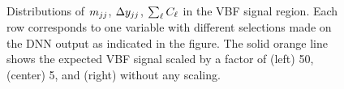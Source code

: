 \begin{figure}[ht]
{        } \\
         \\
        {\caption{Distributions of $m_{jj}$, $\Delta y_{jj}$, $\sum_\ell C_\ell$ in the VBF \TwoJet signal region.
            Each row corresponds to one variable with different selections made on the DNN output as indicated in the figure. The solid orange line shows the expected VBF signal scaled by a factor of (left) 50, (center) 5, and (right) without any scaling.
            \label{fig:dnn-inputs-vbf-top1} }}
    \end{figure}


